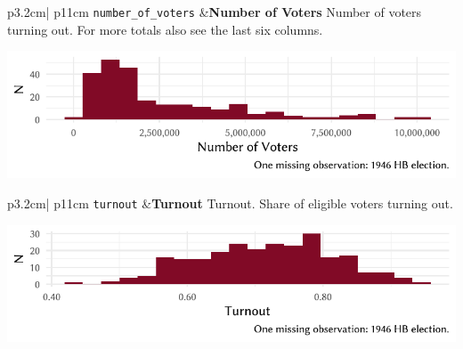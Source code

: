 \documentclass[
]{scrartcl}
\begin{document}
\begin{longtable}{p{3.2cm}| p{11cm}}
\texttt{number\_of\_voters} &\textbf{Number of Voters}\newline 
Number of voters turning out. For more totals also see the last six columns.

\hspace*{.25cm}
\begin{minipage}[t]{\linewidth }
\vspace{0pt}
\includegraphics[width = \linewidth]{cbfiles/nvotersplot.pdf}
\end{minipage}


\end{longtable}

\begin{longtable}{p{3.2cm}| p{11cm}}
\texttt{turnout} &\textbf{Turnout}\newline 
Turnout. Share of eligible voters turning out.

\hspace*{.25cm}
\begin{minipage}[t]{\linewidth }
\vspace{0pt}
\includegraphics[width = \linewidth]{cbfiles/turnoutplot.pdf}
\end{minipage}


\end{longtable}
\end{document}
